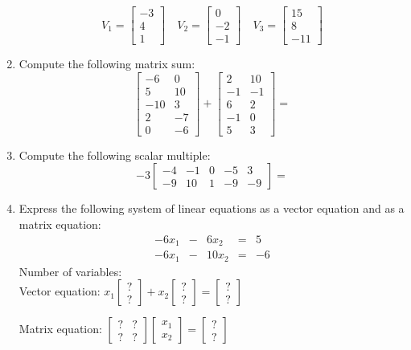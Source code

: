 \documentclass[letterpaper,12pt]{article}
\begin{document}
\begin{enumerate}
\[
 V_1 = \begin{bmatrix}-3\\4\\1\end{bmatrix}\quad V_2 = \begin{bmatrix}0\\-2\\-1\end{bmatrix}\quad V_3 = \begin{bmatrix}15\\8\\-11\end{bmatrix}
\]
\item Compute the following matrix sum:
\[
 \begin{bmatrix}
  -6&0\\5&10\\-10&3\\2&-7\\0&-6
 \end{bmatrix} + \begin{bmatrix}2&10\\-1&-1\\6&2\\-1&0\\5&3\end{bmatrix} = 
\]
\item Compute the following scalar multiple:
\[
 -3\begin{bmatrix}-4&-1&0&-5&3\\-9&10&1&-9&-9\end{bmatrix}=
\]
\item Express the following system of linear equations as a vector equation and as a matrix equation:
\[
 \begin{array}{ccccc}
  -6x_1&-&6x_2&=&5\\
-6x_1&-&10x_2&=&-6
 \end{array}
\]
Number of variables:\\

Vector equation: $x_1\begin{bmatrix}?\\?\end{bmatrix} +x_2\begin{bmatrix}?\\?\end{bmatrix}= \begin{bmatrix}?\\?\end{bmatrix}$

Matrix equation: $\begin{bmatrix}?&?\\?&?\end{bmatrix}\begin{bmatrix}x_1\\x_2\end{bmatrix} = \begin{bmatrix}?\\?\end{bmatrix}$


 \end{enumerate}
\end{document}
